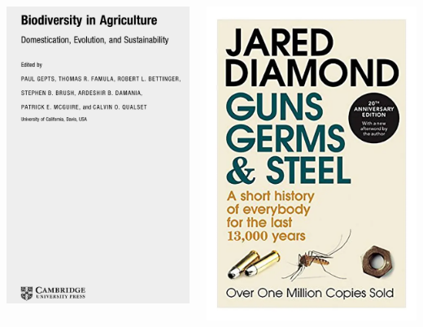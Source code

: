 \documentclass[11pt,ignorenonframetext,aspectratio=169]{beamer}
\newcommand{\bcolumns}{\begin{columns}[T, onlytextwidth]}
\newcommand{\ecolumns}{\end{columns}}
\begin{document}
\begin{frame}{}
\protect\hypertarget{section-1}{}
\bcolumns
{}

\includegraphics[width=0.68\linewidth]{./images/biodiversity_in_agriculture}


\includegraphics[width=0.75\linewidth]{./images/guns_germs_steel}

\ecolumns
\end{frame}
\end{document}
